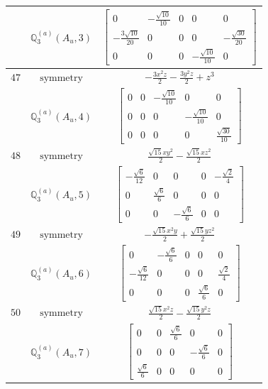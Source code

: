 \documentclass[fleqn,8pt,landscape]{jsarticle}
\begin{document}
\begin{longtable}{ccc}
$  $ & $ \mathbb{Q}_{3}^{(a)}(A_{u},3) $ & $ \begin{bmatrix} 0 & - \frac{\sqrt{10}}{10} & 0 & 0 & 0 \\ - \frac{3 \sqrt{10}}{20} & 0 & 0 & 0 & - \frac{\sqrt{30}}{20} \\ 0 & 0 & 0 & - \frac{\sqrt{10}}{10} & 0 \end{bmatrix} $ \\ \hline
$ 47 $ & $ \text{symmetry} $ & $ - \frac{3 x^{2} z}{2} - \frac{3 y^{2} z}{2} + z^{3} $ \\
$  $ & $ \mathbb{Q}_{3}^{(a)}(A_{u},4) $ & $ \begin{bmatrix} 0 & 0 & - \frac{\sqrt{10}}{10} & 0 & 0 \\ 0 & 0 & 0 & - \frac{\sqrt{10}}{10} & 0 \\ 0 & 0 & 0 & 0 & \frac{\sqrt{30}}{10} \end{bmatrix} $ \\ \hline
$ 48 $ & $ \text{symmetry} $ & $ \frac{\sqrt{15} x y^{2}}{2} - \frac{\sqrt{15} x z^{2}}{2} $ \\
$  $ & $ \mathbb{Q}_{3}^{(a)}(A_{u},5) $ & $ \begin{bmatrix} - \frac{\sqrt{6}}{12} & 0 & 0 & 0 & - \frac{\sqrt{2}}{4} \\ 0 & \frac{\sqrt{6}}{6} & 0 & 0 & 0 \\ 0 & 0 & - \frac{\sqrt{6}}{6} & 0 & 0 \end{bmatrix} $ \\ \hline
$ 49 $ & $ \text{symmetry} $ & $ - \frac{\sqrt{15} x^{2} y}{2} + \frac{\sqrt{15} y z^{2}}{2} $ \\
$  $ & $ \mathbb{Q}_{3}^{(a)}(A_{u},6) $ & $ \begin{bmatrix} 0 & - \frac{\sqrt{6}}{6} & 0 & 0 & 0 \\ - \frac{\sqrt{6}}{12} & 0 & 0 & 0 & \frac{\sqrt{2}}{4} \\ 0 & 0 & 0 & \frac{\sqrt{6}}{6} & 0 \end{bmatrix} $ \\ \hline
$ 50 $ & $ \text{symmetry} $ & $ \frac{\sqrt{15} x^{2} z}{2} - \frac{\sqrt{15} y^{2} z}{2} $ \\
$  $ & $ \mathbb{Q}_{3}^{(a)}(A_{u},7) $ & $ \begin{bmatrix} 0 & 0 & \frac{\sqrt{6}}{6} & 0 & 0 \\ 0 & 0 & 0 & - \frac{\sqrt{6}}{6} & 0 \\ \frac{\sqrt{6}}{6} & 0 & 0 & 0 & 0 \end{bmatrix} $ \\ \hline

\end{longtable}
\end{document}
